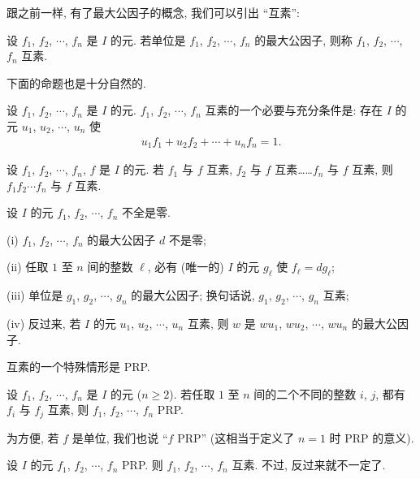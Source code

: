 跟之前一样, 有了最大公因子的概念, 我们可以引出 ``互素'':
\begin{definition}
    设 $f_1$, $f_2$, $\cdots$, $f_n$ 是 $I$ 的元. 若单位是 $f_1$, $f_2$, $\cdots$, $f_n$ 的最大公因子, 则称 $f_1$, $f_2$, $\cdots$, $f_n$ 互素.
\end{definition}

下面的命题也是十分自然的.
\begin{proposition}
    设 $f_1$, $f_2$, $\cdots$, $f_n$ 是 $I$ 的元. $f_1$, $f_2$, $\cdots$, $f_n$ 互素的一个必要与充分条件是: 存在 $I$ 的元 $u_1$, $u_2$, $\cdots$, $u_n$ 使
    \begin{align*}
        u_1 f_1 + u_2 f_2 + \cdots + u_n f_n = 1.
    \end{align*}
\end{proposition}

\begin{proposition}
    设 $f_1$, $f_2$, $\cdots$, $f_n$, $f$ 是 $I$ 的元. 若 $f_1$ 与 $f$ 互素, $f_2$ 与 $f$ 互素……$f_n$ 与 $f$ 互素, 则 $f_1 f_2 \cdots f_n$ 与 $f$ 互素.
\end{proposition}

\begin{proposition}
    设 $I$ 的元 $f_1$, $f_2$, $\cdots$, $f_n$ 不全是零.

    (i) $f_1$, $f_2$, $\cdots$, $f_n$ 的最大公因子 $d$ 不是零;

    (ii) 任取 $1$ 至 $n$ 间的整数 $\ell$, 必有 (唯一的) $I$ 的元 $g_\ell$ 使 $f_\ell = dg_\ell$;

    (iii) 单位是 $g_1$, $g_2$, $\cdots$, $g_n$ 的最大公因子; 换句话说, $g_1$, $g_2$, $\cdots$, $g_n$ 互素;

    (iv) 反过来, 若 $I$ 的元 $u_1$, $u_2$, $\cdots$, $u_n$ 互素, 则 $w$ 是 $wu_1$, $wu_2$, $\cdots$, $wu_n$ 的最大公因子.
\end{proposition}

互素的一个特殊情形是 PRP.

\begin{definition}
    设 $f_1$, $f_2$, $\cdots$, $f_n$ 是 $I$ 的元 ($n \geq 2$). 若任取 $1$ 至 $n$ 间的二个不同的整数 $i$, $j$, 都有 $f_i$ 与 $f_j$ 互素, 则 $f_1$, $f_2$, $\cdots$, $f_n$ PRP.

    为方便, 若 $f$ 是单位, 我们也说 ``$f$ PRP'' (这相当于定义了 $n = 1$ 时 PRP 的意义).
\end{definition}

\begin{proposition}
    设 $I$ 的元 $f_1$, $f_2$, $\cdots$, $f_n$ PRP. 则 $f_1$, $f_2$, $\cdots$, $f_n$ 互素. 不过, 反过来就不一定了.
\end{proposition}

